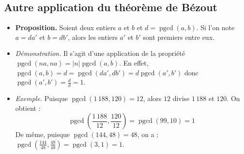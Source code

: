 \documentclass[11pt,class=report,crop=false]{standalone}
\newcommand{\pgcd}{\mathop{\mathrm{pgcd}}\nolimits}
\begin{document}
\subsection*{Autre application du théorème de Bézout}


\begin{itemize}
    \item \textbf{Proposition.} Soient deux entiers $a$ et $b$ et $d=\pgcd(a,b)$. Si l'on note $a=da'$ et $b=db'$, alors les entiers $a'$ et $b'$ sont premiers entre eux.
    
    \item \emph{Démonstration.} Il s'agit d'une application de la propriété $\pgcd(na,na)=|n|\pgcd(a,b)$. 
    En effet, $\pgcd(a,b)=d=\pgcd(da',db')=d\pgcd(a',b')$ donc $\pgcd(a',b')=\frac{d}{d}=1$.
    
    \item \emph{Exemple.} Puisque $\pgcd(1\,188,120)=12$, alors $12$ divise $1\,188$ et $120$. On obtient :
    $$\pgcd \left(\frac{1\,188}{12},\frac{120}{12}\right)=\pgcd(99,10)=1$$
    De même, puisque $\pgcd(144,48)=48$, on a :
    $\pgcd(\frac{144}{48}, \frac{48}{48})=\pgcd(3,1)=1$.
\end{itemize}
\end{document}
